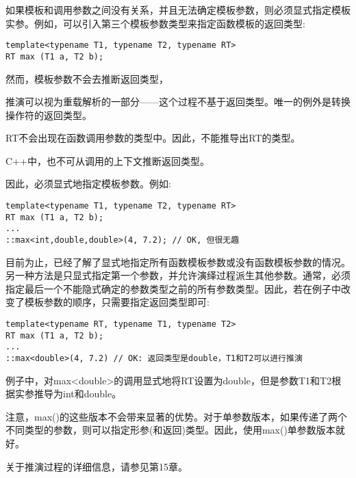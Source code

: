 如果模板和调用参数之间没有关系，并且无法确定模板参数，则必须显式指定模板实参。例如，可以引入第三个模板参数类型来指定函数模板的返回类型:

\begin{lstlisting}[style=styleCXX]
template<typename T1, typename T2, typename RT>
RT max (T1 a, T2 b);
\end{lstlisting}

然而，模板参数不会去推断返回类型，

\begin{tcolorbox}[colback=webgreen!5!white,colframe=webgreen!75!black]
\hspace*{0.75cm}推演可以视为重载解析的一部分——这个过程不基于返回类型。唯一的例外是转换操作符的返回类型。
\end{tcolorbox}

RT不会出现在函数调用参数的类型中。因此，不能推导出RT的类型。

\begin{tcolorbox}[colback=webgreen!5!white,colframe=webgreen!75!black]
\hspace*{0.75cm}C++中，也不可从调用的上下文推断返回类型。
\end{tcolorbox}

因此，必须显式地指定模板参数。例如:

\begin{lstlisting}[style=styleCXX]
template<typename T1, typename T2, typename RT>
RT max (T1 a, T2 b);
...
::max<int,double,double>(4, 7.2); // OK, 但很无趣
\end{lstlisting}

目前为止，已经了解了显式地指定所有函数模板参数或没有函数模板参数的情况。另一种方法是只显式指定第一个参数，并允许演绎过程派生其他参数。通常，必须指定最后一个不能隐式确定的参数类型之前的所有参数类型。因此，若在例子中改变了模板参数的顺序，只需要指定返回类型即可:

\begin{lstlisting}[style=styleCXX]
template<typename RT, typename T1, typename T2>
RT max (T1 a, T2 b);
...
::max<double>(4, 7.2) // OK: 返回类型是double，T1和T2可以进行推演
\end{lstlisting}

例子中，对max<double>的调用显式地将RT设置为double，但是参数T1和T2根据实参推导为int和double。

注意，max()的这些版本不会带来显著的优势。对于单参数版本，如果传递了两个不同类型的参数，则可以指定形参(和返回)类型。因此，使用max()单参数版本就好。

关于推演过程的详细信息，请参见第15章。

